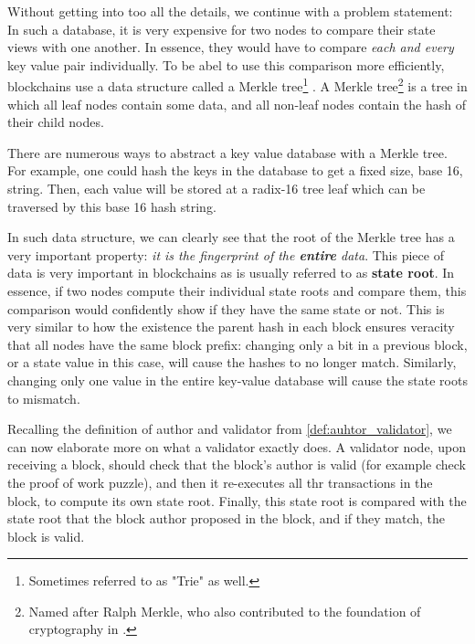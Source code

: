 Without getting into too all the details, we continue with a problem statement: In such a database,
it is very expensive for two nodes to compare their state views with one another. In essence, they
would have to compare \textit{each and every} key value pair individually. To be abel to use this
comparison more efficiently, blockchains use a data structure called a Merkle
tree\footnote{Sometimes referred to as "Trie" as well.} \cite{merkleDigitalSignatureBased1988}. A
Merkle tree\footnote{Named after Ralph Merkle, who also contributed to the foundation of
cryptography in \cite{merkleSecureCommunicationsInsecure1978}.} is a tree in which all leaf nodes
contain some data, and all non-leaf nodes contain the hash of their child nodes.

There are numerous ways to abstract a key value database with a Merkle tree. For example, one could
hash the keys in the database to get a fixed size, base 16, string. Then, each value will be stored
at a radix-16 tree leaf which can be traversed by this base 16 hash string.


In such data structure, we can clearly see that the root of the Merkle tree has a very important
property: \textit{it is the fingerprint of the \textbf{entire} data}. This piece of data is very
important in blockchains as is usually referred to as \textbf{state root}. In essence, if two nodes
compute their individual state roots and compare them, this comparison would confidently show if
they have the same state or not. This is very similar to how the existence the parent hash in each
block ensures veracity that all nodes have the same block prefix: changing only a bit in a previous
block, or a state value in this case, will cause the hashes to no longer match. Similarly, changing
only one value in the entire key-value database will cause the state roots to mismatch.

Recalling the definition of author and validator from \ref{def:auhtor_validator}, we can now
elaborate more on what a validator exactly does. A validator node, upon receiving a block, should
check that the block's author is valid (for example check the proof of work puzzle), and then it
re-executes all thr transactions in the block, to compute its own state root. Finally, this state
root is compared with the state root that the block author proposed in the block, and if they match,
the block is valid.

